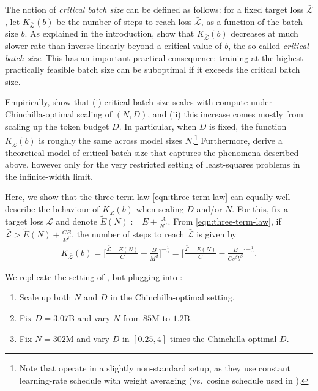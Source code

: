 \documentclass[12pt,a4paper,twoside]{article}
\begin{document}
The notion of \emph{critical batch size} can be defined as follows: for a fixed target loss $\bar{\mathcal{L}}$, let 
$K_{\bar{\mathcal{L}}}(b)$ be the number of steps to reach loss $\bar{\mathcal{L}}$, as a function of the batch size $b$. As explained in the introduction, \citet{McCandlish2018} show that $K_{\bar{\mathcal{L}}}(b)$ decreases at much slower rate than inverse-linearly beyond a critical value of $b$, the so-called \emph{critical batch size}. This has an important practical consequence: training at the highest practically feasible batch size can be suboptimal if it exceeds the critical batch size. 

Empirically, \citet{Zhang2025} show that (i) critical batch size scales with compute under Chinchilla-optimal scaling of $(N,D)$, and (ii) this increase comes mostly from scaling up the token budget $D$. In particular, when $D$ is fixed, the function $K_{\bar{\mathcal{L}}}(b)$ is roughly the same across model sizes $N$.\footnote{Note that \citet{Zhang2025} operate in a slightly non-standard setup, as they use constant learning-rate schedule with weight averaging (vs.\ cosine schedule used in \citet{Li2025}).} Furthermore, \citet{Zhang2025} derive a theoretical model of critical batch size that captures the phenomena described above, however only for the very restricted setting of least-squares problems in the infinite-width limit.

Here, we show that the three-term law \eqref{eqn:three-term-law} can equally well describe the behaviour of $K_{\bar{\mathcal{L}}}(b)$ when scaling $D$ and/or $N$. For this, fix a target loss $\bar{\mathcal{L}}$ and denote $\tilde{E}(N):=E + \frac{A}{N^\alpha}$. From \eqref{eqn:three-term-law}, if $\bar{\mathcal{L}} > \tilde{E}(N) + \frac{CB}{M^\beta}$, the number of steps to reach $\bar{\mathcal{L}}$ is given by
\begin{align}\label{eqn:steps-to-loss}
    K_{\bar{\mathcal{L}}}(b) = \Big[ \frac{\bar{\mathcal{L}} - \tilde{E}(N)}{C} - \frac{B}{M^\beta}\Big] ^{-\frac{1}{\gamma}} =
    \Big[ \frac{\bar{\mathcal{L}} - \tilde{E}(N)}{C} - \frac{B}{Cs^\beta b^{\beta}}\Big] ^{-\frac{1}{\gamma}}.
\end{align}


We replicate the setting of \citet[Figure 1]{Zhang2025}, but plugging into \tttl{}:
\begin{enumerate}[label=(A\arabic*)]
    \item Scale up both $N$ and $D$ in the Chinchilla-optimal setting. 
    \item Fix $D=3.07$B and vary $N$ from $85$M to $1.2$B.
    \item Fix $N=302$M and vary $D$ in $[0.25,4]$ times the Chinchilla-optimal $D$.
\end{enumerate}
\end{document}
